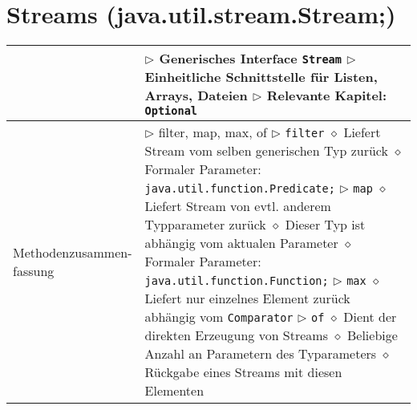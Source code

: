 	
\section{Streams (java.util.stream.Stream;)}
	\begin{tabular}{ | p{} p{} | }
	\hline
	
	\makecell[l]{Information} & \makecell[l]{
	$\triangleright$ Generisches Interface \texttt{Stream} \\
	$\triangleright$ Einheitliche Schnittstelle für Listen, Arrays, Dateien \\
	$\triangleright$ Relevante Kapitel: \texttt{Optional} \\
	} \\ \hline

	\makecell[l]{Methodenzusammen- \\ fassung} & \makecell[l]{
	$\triangleright$ filter, map, max, of \\
	$\triangleright$ \texttt{filter} \\
	\hspace{0.4cm} $\diamond$ Liefert Stream vom selben generischen Typ zurück \\
	\hspace{0.4cm} $\diamond$ Formaler Parameter: \texttt{java.util.function.Predicate;} \\
	$\triangleright$ \texttt{map} \\
	\hspace{0.4cm} $\diamond$ Liefert Stream von evtl. anderem Typparameter zurück \\
	\hspace{0.4cm} $\diamond$ Dieser Typ ist abhängig vom aktualen Parameter \\
	\hspace{0.4cm} $\diamond$ Formaler Parameter: \texttt{java.util.function.Function;} \\
	$\triangleright$ \texttt{max} \\
	\hspace{0.4cm} $\diamond$ Liefert nur einzelnes Element zurück abhängig vom \texttt{Comparator} \\
	$\triangleright$ \texttt{of} \\
	\hspace{0.4cm} $\diamond$ Dient der direkten Erzeugung von Streams \\
	\hspace{0.4cm} $\diamond$ Beliebige Anzahl an Parametern des Typarameters \\
	\hspace{0.4cm} $\diamond$ Rückgabe eines Streams mit diesen Elementen \\
}
\end{tabular}
